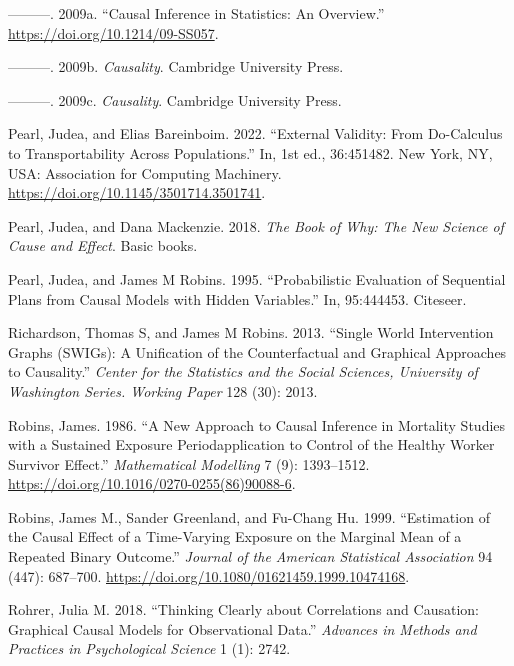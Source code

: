 \documentclass[
  singlecolumn]{report}
\newlength{\cslhangindent}
\newlength{\cslentryspacingunit} %
\newenvironment{CSLReferences}[2] %
 {%
  \setlength{\parindent}{0pt}
  \ifodd #1
  \let\oldpar\par
  \def\par{\hangindent=\cslhangindent\oldpar}
  \fi
  \setlength{\parskip}{#2\cslentryspacingunit}
 }%
 {}
\begin{document}
\begin{CSLReferences}{1}{0}
\leavevmode{}%
---------. 2009a. {``Causal Inference in Statistics: An Overview.''}
\url{https://doi.org/10.1214/09-SS057}.

\leavevmode{}%
---------. 2009b. \emph{Causality}. Cambridge University Press.

\leavevmode{}%
---------. 2009c. \emph{Causality}. Cambridge University Press.

\leavevmode{}%
Pearl, Judea, and Elias Bareinboim. 2022. {``External Validity: From
Do-Calculus to Transportability Across Populations.''} In, 1st ed.,
36:451482. New York, NY, USA: Association for Computing Machinery.
\url{https://doi.org/10.1145/3501714.3501741}.

\leavevmode{}%
Pearl, Judea, and Dana Mackenzie. 2018. \emph{The Book of Why: The New
Science of Cause and Effect}. Basic books.

\leavevmode{}%
Pearl, Judea, and James M Robins. 1995. {``Probabilistic Evaluation of
Sequential Plans from Causal Models with Hidden Variables.''} In,
95:444453. Citeseer.

\leavevmode{}%
Richardson, Thomas S, and James M Robins. 2013. {``Single World
Intervention Graphs (SWIGs): A Unification of the Counterfactual and
Graphical Approaches to Causality.''} \emph{Center for the Statistics
and the Social Sciences, University of Washington Series. Working Paper}
128 (30): 2013.

\leavevmode{}%
Robins, James. 1986. {``A New Approach to Causal Inference in Mortality
Studies with a Sustained Exposure Period{\textemdash}application to
Control of the Healthy Worker Survivor Effect.''} \emph{Mathematical
Modelling} 7 (9): 1393--1512.
\url{https://doi.org/10.1016/0270-0255(86)90088-6}.

\leavevmode{}%
Robins, James M., Sander Greenland, and Fu-Chang Hu. 1999. {``Estimation
of the Causal Effect of a Time-Varying Exposure on the Marginal Mean of
a Repeated Binary Outcome.''} \emph{Journal of the American Statistical
Association} 94 (447): 687--700.
\url{https://doi.org/10.1080/01621459.1999.10474168}.

\leavevmode{}%
Rohrer, Julia M. 2018. {``Thinking Clearly about Correlations and
Causation: Graphical Causal Models for Observational Data.''}
\emph{Advances in Methods and Practices in Psychological Science} 1 (1):
2742.


\end{CSLReferences}
\end{document}
